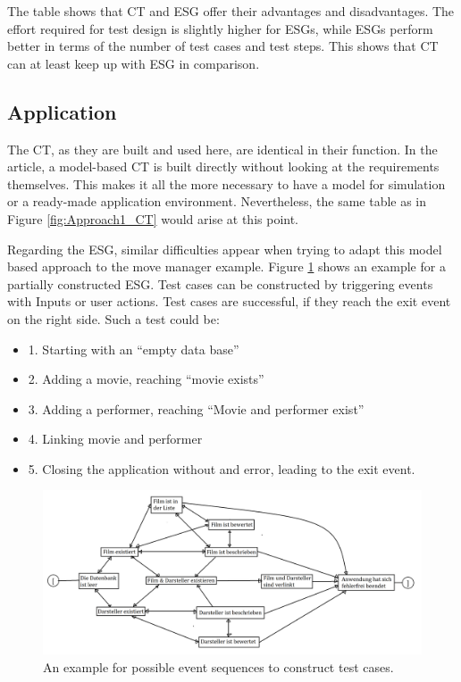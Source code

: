 The table shows that CT and ESG offer their advantages and disadvantages. The effort required for test design is slightly higher for ESGs, while ESGs perform better in terms of the number of test cases and test steps. This shows that CT can at least keep up with ESG in comparison.

\subsection{Application}

The CT, as they are built and used here, are identical in their function. In the article, a model-based CT is built directly without looking at the requirements themselves. This makes it all the more necessary to have a model for simulation or a ready-made application environment. Nevertheless, the same table as in Figure \ref{fig:Approach1_CT} would arise at this point.

Regarding the ESG, similar difficulties appear when trying to adapt this model based approach to the move manager example. Figure \ref{fig:ESG_example} shows an example for a partially constructed ESG. Test cases can be constructed by triggering events with Inputs or user actions. Test cases are successful, if they reach the exit event on the right side. Such a test could be: 

\begin{itemize}
	\item 1. Starting with an \enquote{empty data base}
	\item 2. Adding a movie, reaching \enquote{movie exists}
	\item 3. Adding a performer, reaching \enquote{Movie and performer exist}
	\item 4. Linking movie and performer
	\item 5. Closing the application without and error, leading to the exit event.
\end{itemize}

\begin{figure}[H]
\centering
\includegraphics[scale=0.2]{../../individual/groeger/images/ESGamBeispiel.png} 
\caption{An example for possible event sequences to construct test cases.}
\label{fig:ESG_example}
\end{figure}

